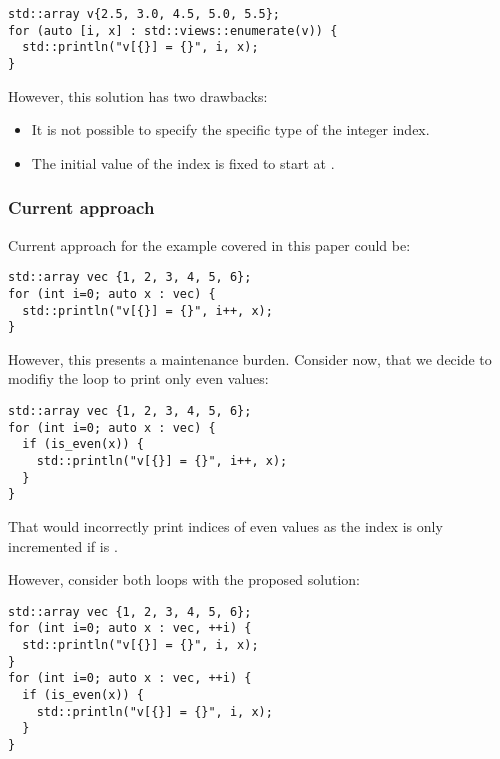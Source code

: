 \begin{lstlisting}
std::array v{2.5, 3.0, 4.5, 5.0, 5.5};
for (auto [i, x] : std::views::enumerate(v)) {
  std::println("v[{}] = {}", i, x);
}
\end{lstlisting}

However, this solution has two drawbacks:
\begin{itemize}

\item 
It is not possible to specify the specific type of the integer index.

\item 
The initial value of the index is fixed to start at .

\end{itemize}

\subsubsection{Current approach}

Current approach for the example covered in this paper could be:
\begin{lstlisting}
std::array vec {1, 2, 3, 4, 5, 6};
for (int i=0; auto x : vec) {
  std::println("v[{}] = {}", i++, x);
}
\end{lstlisting}

However, this presents a maintenance burden. Consider now, that we decide to
modifiy the loop to print only even values:

\begin{lstlisting}
std::array vec {1, 2, 3, 4, 5, 6};
for (int i=0; auto x : vec) {
  if (is_even(x)) {
    std::println("v[{}] = {}", i++, x);
  }
}
\end{lstlisting}

That would incorrectly print indices of even values as the index is only
incremented if  is .

However, consider both loops with the proposed solution:
\begin{lstlisting}
std::array vec {1, 2, 3, 4, 5, 6};
for (int i=0; auto x : vec, ++i) {
  std::println("v[{}] = {}", i, x);
}
for (int i=0; auto x : vec, ++i) {
  if (is_even(x)) {
    std::println("v[{}] = {}", i, x);
  }
}
\end{lstlisting}

